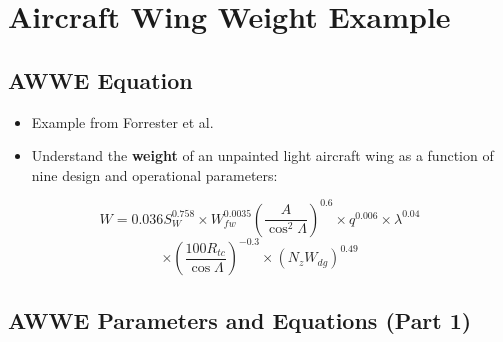 \documentclass[
  letterpaper,
  DIV=11,
  numbers=noendperiod]{scrreprt}
\providecommand{\tightlist}{%
  \setlength{\itemsep}{0pt}\setlength{\parskip}{0pt}}\usepackage{longtable,booktabs,array}
\begin{document}
\hypertarget{aircraft-wing-weight-example}{%
\chapter{Aircraft Wing Weight
Example}\label{aircraft-wing-weight-example}}

\hypertarget{awwe-equation}{%
\section{AWWE Equation}\label{awwe-equation}}

\begin{itemize}
\tightlist
\item
  Example from Forrester et al.~
\item
  Understand the \textbf{weight} of an unpainted light aircraft wing as
  a function of nine design and operational parameters:
\end{itemize}

\[ W = 0.036 S_W^{0.758} \times W_{fw}^{0.0035} \left( \frac{A}{\cos^2 \Lambda} \right)^{0.6} \times  q^{0.006}  \times \lambda^{0.04} \]
\[ \times \left( \frac{100 R_{tc}}{\cos \Lambda} \right)^{-0.3} \times (N_z W_{dg})^{0.49}\]

\hypertarget{awwe-parameters-and-equations-part-1}{%
\section{AWWE Parameters and Equations (Part
1)}\label{awwe-parameters-and-equations-part-1}}
\end{document}
